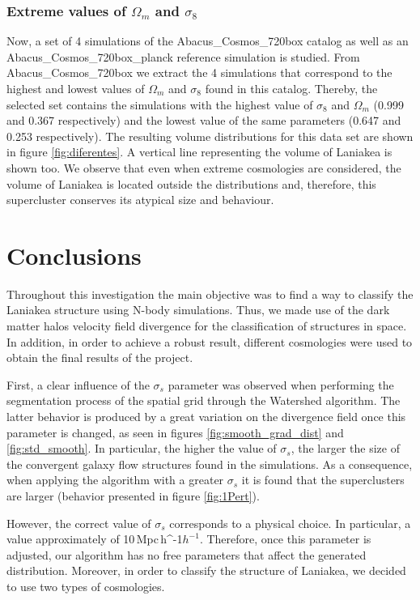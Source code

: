 \documentclass[usenatbib]{mnras}
\newcommand{\Mpch}{\,{\rm Mpc}\,\ifmmode h^{-1}\else $h^{-1}$\fi}
\begin{document}
\subsubsection{Extreme values of $\Omega_m$ and $\sigma_8$}

Now, a set of 4 simulations of the Abacus\_Cosmos\_720box catalog as
well as an Abacus\_Cosmos\_720box\_planck reference simulation is
studied. From Abacus\_Cosmos\_720box we extract the 4 simulations that
correspond to the highest and lowest values of $\Omega_m$ and
$\sigma_8$ found in this catalog. Thereby, the selected set contains
the simulations with the highest value of $\sigma_8$ and $\Omega_m$
(0.999 and 0.367 respectively) and the lowest value of the same
parameters (0.647 and 0.253 respectively). The resulting volume
distributions for this data set are shown in figure
\ref{fig:diferentes}. A vertical line representing the volume of
Laniakea is shown too. We observe that even when extreme cosmologies
are considered, the volume of Laniakea is located outside the
distributions and, therefore, this supercluster conserves its atypical
size and behaviour. 



\section{Conclusions}
\label{sec:conclusions}


Throughout this investigation the main objective was to find a way to classify the Laniakea structure using N-body simulations. Thus, we made use of the dark matter halos velocity field divergence for the classification of structures in space. In addition, in order to achieve a robust result, different cosmologies were used to obtain the final results of the project.


First, a clear influence of the $\sigma_s$ parameter was observed when performing the segmentation process of the spatial grid through the Watershed algorithm. The latter behavior is produced by a great variation on the divergence field once this parameter is changed, as seen in figures \ref{fig:smooth_grad_dist} and \ref{fig:std_smooth}. In particular, the higher the value of $\sigma_s$, the larger the size of the convergent galaxy flow structures found in the simulations. As a consequence, when applying the algorithm with a greater $\sigma_s$ it is found that the superclusters are larger (behavior presented in figure \ref{fig:1Pert}).

However, the correct value of $\sigma_s$ corresponds to a physical choice. In particular, a value approximately of 10\Mpch. Therefore, once this parameter is adjusted, our algorithm has no free parameters that affect the generated distribution. Moreover, in order to classify the structure of Laniakea, we decided to use two types of cosmologies. 
\end{document}
